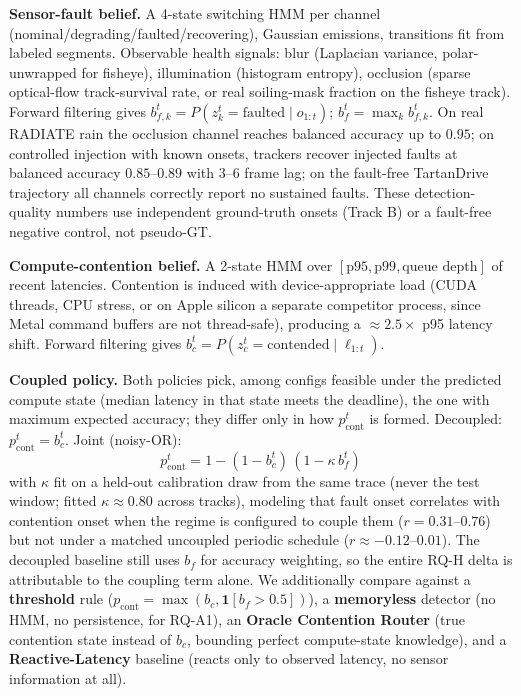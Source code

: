 \documentclass[conference]{IEEEtran}
\begin{document}
\textbf{Sensor-fault belief.} A 4-state switching HMM per channel
(nominal/degrading/faulted/recovering), Gaussian emissions,
transitions fit from labeled segments. Observable health signals:
blur (Laplacian variance, polar-unwrapped for fisheye), illumination
(histogram entropy), occlusion (sparse optical-flow track-survival
rate, or real soiling-mask fraction on the fisheye track). Forward
filtering gives $b_{f,k}^t=P(z_k^t{=}\text{faulted}\mid o_{1:t})$;
$b_f^t=\max_k b_{f,k}^t$. On real RADIATE rain the occlusion channel
reaches balanced accuracy up to $0.95$; on controlled injection with
known onsets, trackers recover injected faults at balanced accuracy
$0.85$--$0.89$ with $3$--$6$ frame lag; on the fault-free TartanDrive
trajectory all channels correctly report no sustained faults. These
detection-quality numbers use independent ground-truth onsets (Track
B) or a fault-free negative control, not pseudo-GT.

\textbf{Compute-contention belief.} A 2-state HMM over
$[\text{p95},\text{p99},\text{queue depth}]$ of recent latencies.
Contention is induced with device-appropriate load (CUDA threads,
CPU stress, or on Apple silicon a separate competitor process, since
Metal command buffers are not thread-safe), producing a
$\approx\!2.5\times$ p95 latency shift. Forward filtering gives
$b_c^t=P(z_c^t{=}\text{contended}\mid \ell_{1:t})$.

\textbf{Coupled policy.} Both policies pick, among configs feasible
under the predicted compute state (median latency in that state
meets the deadline), the one with maximum expected accuracy; they
differ only in how $p_{\text{cont}}^t$ is formed. Decoupled:
$p_{\text{cont}}^t=b_c^t$. Joint (noisy-OR):
\begin{equation}
  p_{\text{cont}}^t = 1 - (1 - b_c^t)\,(1 - \kappa\, b_f^t)
  \label{eq:noisyor}
\end{equation}
with $\kappa$ fit on a held-out calibration draw from the same trace
(never the test window; fitted $\kappa\approx0.80$ across tracks),
modeling that fault onset correlates with contention onset when the
regime is configured to couple them ($r{=}0.31$--$0.76$) but not
under a matched uncoupled periodic schedule ($r\approx{-}0.12$--$0.01$).
The decoupled baseline still uses $b_f$ for accuracy weighting, so
the entire RQ-H delta is attributable to the coupling term alone. We
additionally compare against a \textbf{threshold} rule
($p_{\text{cont}}=\max(b_c,\mathbf{1}[b_f{>}0.5])$), a
\textbf{memoryless} detector (no HMM, no persistence, for RQ-A1), an
\textbf{Oracle Contention Router} (true contention state instead of
$b_c$, bounding perfect compute-state knowledge), and a
\textbf{Reactive-Latency} baseline (reacts only to observed latency,
no sensor information at all).
\end{document}
